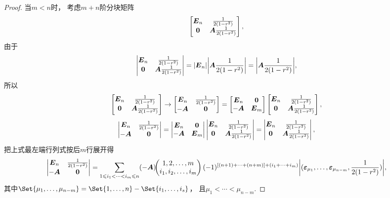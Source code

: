 \begin{theorem}
\begin{proof}
当\(m<n\)时，
考虑\(m+n\)阶分块矩阵\[
	\begin{bmatrix}
		\E_n & \B \\
		\z & \A\B
	\end{bmatrix},
\]
由于\[
	\begin{vmatrix}
		\E_n & \B \\
		\z & \A\B
	\end{vmatrix}
	= \abs{\E_n} \abs{\A\B}
	= \abs{\A\B},
\]
所以\[
	\begin{bmatrix}
		\E_n & \B \\
		\z & \A\B
	\end{bmatrix}
	\to
	\begin{bmatrix}
		\E_n & \B \\
		-\A & \z
	\end{bmatrix}
	= \begin{bmatrix}
		\E_n & \z \\
		-\A & \E_m
	\end{bmatrix} \begin{bmatrix}
		\E_n & \B \\
		\z & \A\B
	\end{bmatrix},
\]\[
	\begin{vmatrix}
		\E_n & \B \\
		-\A & \z
	\end{vmatrix}
	= \begin{vmatrix}
		\E_n & \z \\
		-\A & \E_m
	\end{vmatrix} \begin{vmatrix}
		\E_n & \B \\
		\z & \A\B
	\end{vmatrix}
	= \begin{vmatrix}
		\E_n & \B \\
		\z & \A\B
	\end{vmatrix},
\]
把上式最左端行列式按后\(m\)行展开得\[
	\begin{vmatrix}
		\E_n & \B \\
		-\A & \z
	\end{vmatrix}
	= \sum\limits_{1 \leqslant i_1 < \dotsb < i_m \leqslant n}
	\MatrixMinor{(-\A)}{
		1,2,\dotsc,m \\
		i_1,i_2,\dotsc,i_m
	}
	(-1)^{[(n+1)+\dotsb+(n+m)]+(i_1+\dotsb+i_m)}
	\abs{(\e_{\mu_1},\dotsc,\e_{\mu_{n-m}},\B)},
\]
其中\(\Set{\mu_1,\dotsc,\mu_{n-m}}
= \Set{1,\dotsc,n}-\Set{i_1,\dotsc,i_s}\)，
且\(\mu_1<\dotsb<\mu_{n-m}\).


\end{proof}
\end{theorem}
